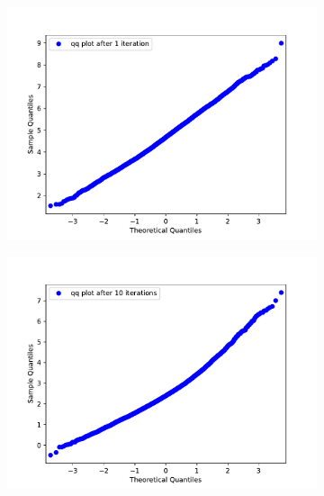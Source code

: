 \documentclass{scrartcl}
\begin{document}
		\begin{figure}[H]
			\centering
			\begin{subfigure}[c]{0.32\textwidth}
				\includegraphics[width=\textwidth]{../imgs/harmonic_oscillator_track/track_10010000_qq_1.pdf}
			\end{subfigure}
			\begin{subfigure}[c]{0.32\textwidth}
				\includegraphics[width=\textwidth]{../imgs/harmonic_oscillator_track/track_10010000_qq_10.pdf}
			\end{subfigure}
			\begin{subfigure}[c]{0.32\textwidth}

\end{subfigure}
\end{figure}
\end{document}
